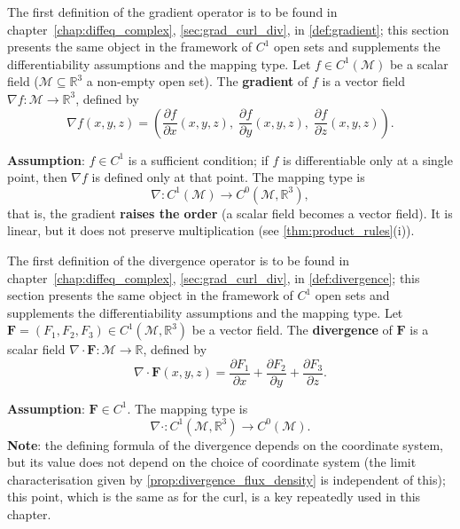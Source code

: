 \begin{definition}[Gradient]\label{def:gradient_vf}
The first definition of the gradient operator is to be found in chapter~\ref{chap:diffeq_complex}, \cref{sec:grad_curl_div}, in \cref{def:gradient}; this section presents the same object in the framework of $C^1$ open sets and supplements the differentiability assumptions and the mapping type.
Let $f \in C^1(\mathcal{M})$ be a scalar field ($\mathcal M\subseteq\mathbb R^3$ a non-empty open set). The \textbf{gradient} of $f$ is a vector field $\nabla f: \mathcal{M} \to \mathbb{R}^3$, defined by
\[
\nabla f(x,y,z) = \left( \frac{\partial f}{\partial x}(x,y,z),\; \frac{\partial f}{\partial y}(x,y,z),\; \frac{\partial f}{\partial z}(x,y,z) \right).
\]

\textbf{Assumption}: $f\in C^1$ is a sufficient condition; if $f$ is differentiable only at a single point, then $\nabla f$ is defined only at that point. The mapping type is
\[
\nabla: C^1(\mathcal{M}) \to C^0(\mathcal{M}, \mathbb{R}^3),
\]
that is, the gradient \textbf{raises the order} (a scalar field becomes a vector field). It is linear, but it does not preserve multiplication (see \cref{thm:product_rules}(i)).
\end{definition}

\begin{definition}[Divergence]\label{def:divergence_vf}
The first definition of the divergence operator is to be found in chapter~\ref{chap:diffeq_complex}, \cref{sec:grad_curl_div}, in \cref{def:divergence}; this section presents the same object in the framework of $C^1$ open sets and supplements the differentiability assumptions and the mapping type.
Let $\mathbf{F} = (F_1, F_2, F_3) \in C^1(\mathcal{M}, \mathbb{R}^3)$ be a vector field. The \textbf{divergence} of $\mathbf{F}$ is a scalar field $\nabla \cdot \mathbf{F}: \mathcal{M} \to \mathbb{R}$, defined by
\[
\nabla \cdot \mathbf{F}(x,y,z) = \frac{\partial F_1}{\partial x} + \frac{\partial F_2}{\partial y} + \frac{\partial F_3}{\partial z}.
\]

\textbf{Assumption}: $\mathbf F\in C^1$. The mapping type is
\[
\nabla\cdot: C^1(\mathcal{M}, \mathbb{R}^3) \to C^0(\mathcal{M}).
\]
\textbf{Note}: the defining formula of the divergence depends on the coordinate system, but its value does not depend on the choice of coordinate system (the limit characterisation given by \cref{prop:divergence_flux_density} is independent of this); this point, which is the same as for the curl, is a key repeatedly used in this chapter.
\end{definition}

